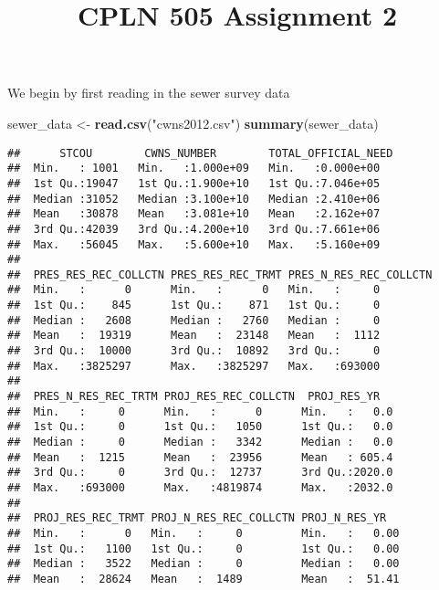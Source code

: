 \documentclass[]{article}
\title{CPLN 505 Assignment 2}
\author{}
\date{}
\newenvironment{Shaded}{\begin{snugshade}}{\end{snugshade}}
\newcommand{\KeywordTok}[1]{\textcolor[rgb]{0.13,0.29,0.53}{\textbf{#1}}}
\newcommand{\StringTok}[1]{\textcolor[rgb]{0.31,0.60,0.02}{#1}}
\newcommand{\NormalTok}[1]{#1}
\begin{document}
\maketitle

We begin by first reading in the sewer survey data

\begin{Shaded}
\begin{Highlighting}[]
\NormalTok{sewer_data <-}\StringTok{ }\KeywordTok{read.csv}\NormalTok{(}\StringTok{"cwns2012.csv"}\NormalTok{)}
\KeywordTok{summary}\NormalTok{(sewer_data)}
\end{Highlighting}
\end{Shaded}

\begin{verbatim}
##      STCOU        CWNS_NUMBER        TOTAL_OFFICIAL_NEED
##  Min.   : 1001   Min.   :1.000e+09   Min.   :0.000e+00  
##  1st Qu.:19047   1st Qu.:1.900e+10   1st Qu.:7.046e+05  
##  Median :31052   Median :3.100e+10   Median :2.410e+06  
##  Mean   :30878   Mean   :3.081e+10   Mean   :2.162e+07  
##  3rd Qu.:42039   3rd Qu.:4.200e+10   3rd Qu.:7.661e+06  
##  Max.   :56045   Max.   :5.600e+10   Max.   :5.160e+09  
##                                                         
##  PRES_RES_REC_COLLCTN PRES_RES_REC_TRMT PRES_N_RES_REC_COLLCTN
##  Min.   :      0      Min.   :      0   Min.   :     0        
##  1st Qu.:    845      1st Qu.:    871   1st Qu.:     0        
##  Median :   2608      Median :   2760   Median :     0        
##  Mean   :  19319      Mean   :  23148   Mean   :  1112        
##  3rd Qu.:  10000      3rd Qu.:  10892   3rd Qu.:     0        
##  Max.   :3825297      Max.   :3825297   Max.   :693000        
##                                                               
##  PRES_N_RES_REC_TRTM PROJ_RES_REC_COLLCTN  PROJ_RES_YR    
##  Min.   :     0      Min.   :      0      Min.   :   0.0  
##  1st Qu.:     0      1st Qu.:   1050      1st Qu.:   0.0  
##  Median :     0      Median :   3342      Median :   0.0  
##  Mean   :  1215      Mean   :  23956      Mean   : 605.4  
##  3rd Qu.:     0      3rd Qu.:  12737      3rd Qu.:2020.0  
##  Max.   :693000      Max.   :4819874      Max.   :2032.0  
##                                                           
##  PROJ_RES_REC_TRMT PROJ_N_RES_REC_COLLCTN PROJ_N_RES_YR    
##  Min.   :      0   Min.   :     0         Min.   :   0.00  
##  1st Qu.:   1100   1st Qu.:     0         1st Qu.:   0.00  
##  Median :   3522   Median :     0         Median :   0.00  
##  Mean   :  28624   Mean   :  1489         Mean   :  51.41  

\end{verbatim}
\end{document}
